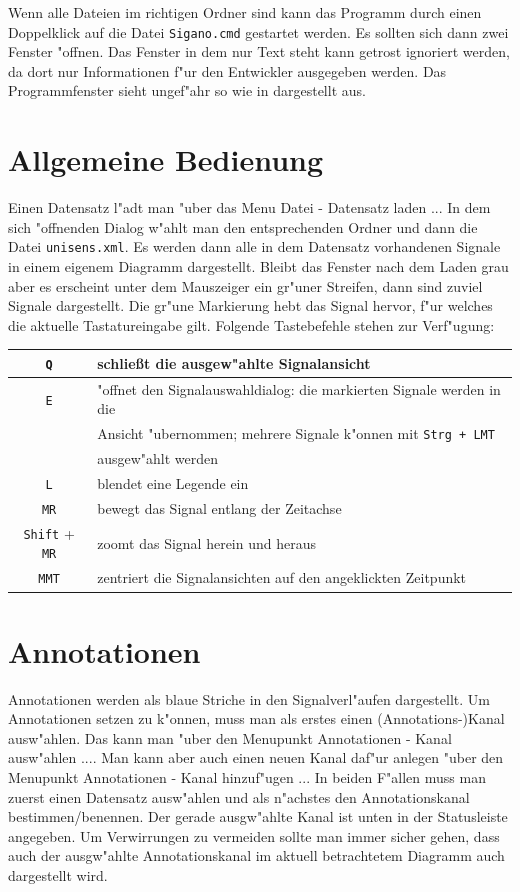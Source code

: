 Wenn alle Dateien im richtigen Ordner sind kann das Programm durch einen Doppelklick auf die Datei \verb|Sigano.cmd| gestartet werden.
Es sollten sich dann zwei Fenster "offnen.
Das Fenster in dem nur Text steht kann getrost ignoriert werden, da dort nur Informationen f"ur den Entwickler ausgegeben werden.
Das Programmfenster sieht ungef"ahr so wie in  dargestellt aus.

\section{Allgemeine Bedienung}

Einen Datensatz l"adt man "uber das Menu \textsf{Datei - Datensatz laden ...}
In dem sich "offnenden Dialog w"ahlt man den entsprechenden Ordner und dann die Datei \verb|unisens.xml|.
Es werden dann alle in dem Datensatz vorhandenen Signale in einem eigenem Diagramm dargestellt.
Bleibt das Fenster nach dem Laden grau aber es erscheint unter dem Mauszeiger ein gr"uner Streifen, dann sind zuviel Signale dargestellt.
Die gr"une Markierung hebt das Signal hervor, f"ur welches die aktuelle Tastatureingabe gilt.
Folgende Tastebefehle stehen zur Verf"ugung:

\noindent
\begin{tabular}{c|l}
	\verb|Q| & schlie\ss t die ausgew"ahlte Signalansicht \\ \hline
	\verb|E| & "offnet den Signalauswahldialog: die markierten Signale werden in die\\
			 & Ansicht "ubernommen; mehrere Signale k"onnen mit \verb|Strg + LMT|\\
			 & ausgew"ahlt werden\\ \hline
	\verb|L| & blendet eine Legende ein\\ \hline
	\verb|MR| & bewegt das Signal entlang der Zeitachse\\ \hline
	\verb|Shift| + \verb|MR| & zoomt das Signal herein und heraus\\\hline
	\verb|MMT| & zentriert die Signalansichten auf den angeklickten Zeitpunkt\\
\end{tabular}

\section{Annotationen}

Annotationen werden als blaue Striche in den Signalverl"aufen dargestellt.
Um Annotationen setzen zu k"onnen, muss man als erstes einen (Annotations-)Kanal ausw"ahlen.
Das kann man "uber den Menupunkt \textsf{Annotationen - Kanal ausw"ahlen ...}.
Man kann aber auch einen neuen Kanal daf"ur anlegen "uber den Menupunkt \textsf{Annotationen - Kanal hinzuf"ugen ...}
In beiden F"allen muss man zuerst einen Datensatz ausw"ahlen und als n"achstes den Annotationskanal bestimmen/benennen.
Der gerade ausgw"ahlte Kanal ist unten in der Statusleiste angegeben.
Um Verwirrungen zu vermeiden sollte man immer sicher gehen, dass auch der ausgw"ahlte Annotationskanal im aktuell betrachtetem Diagramm auch dargestellt wird.

